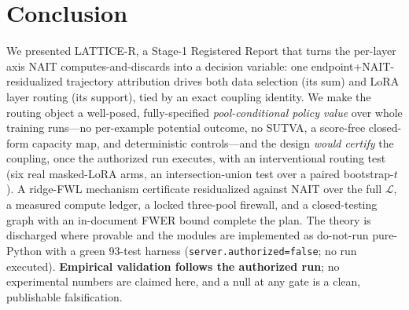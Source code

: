 \documentclass[11pt]{article}
\theoremstyle{definition}
\newcommand{\Lset}{\mathcal{L}}
\begin{document}
\section{Conclusion}
\label{sec:conclusion}
We presented LATTICE-R, a Stage-1 Registered Report that turns the per-layer axis NAIT
computes-and-discards into a decision variable: one endpoint+NAIT-residualized trajectory
attribution drives both data selection (its sum) and LoRA layer routing (its support), tied
by an exact coupling identity. We make the routing object a well-posed, fully-specified
\emph{pool-conditional policy value} over whole training runs---no per-example potential
outcome, no SUTVA, a score-free closed-form capacity map, and deterministic
controls---and the design \emph{would certify} the coupling, once the authorized run
executes, with an interventional routing test (six real masked-LoRA arms, an
intersection-union test over a paired bootstrap-$t$). A ridge-FWL mechanism certificate
residualized against NAIT over the full $\Lset$, a measured compute ledger, a locked
three-pool firewall, and a closed-testing graph with an in-document FWER bound complete
the plan. The theory is discharged where provable and the modules are
implemented as do-not-run pure-Python with a green 93-test harness
(\texttt{server.authorized=false}; no run executed). \textbf{Empirical validation follows
the authorized run}; no experimental numbers are claimed here, and a null at any gate is a
clean, publishable falsification.



\end{document}
